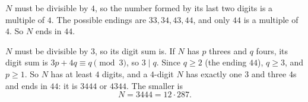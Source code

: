 $N$ must be divisible by $4$, so the number formed by its last two digits is a multiple of $4$. The possible endings are $33,34,43,44$, and only $44$ is a multiple of $4$. So $N$ ends in $44$.

$N$ must be divisible by $3$, so its digit sum is. If $N$ has $p$ threes and $q$ fours, its digit sum is $3p+4q\equiv q\pmod3$, so $3\mid q$. Since $q\ge2$ (the ending $44$), $q\ge3$, and $p\ge1$. So $N$ has at least $4$ digits, and a $4$-digit $N$ has exactly one $3$ and three $4$s and ends in $44$: it is $3444$ or $4344$. The smaller is
\[N=\boxed{3444}=12\cdot287.\]
